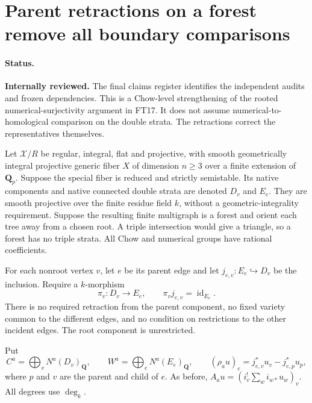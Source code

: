 \section{Parent retractions on a forest remove all boundary comparisons}
\label{r17fr:section}

\paragraph{Status.}
\textbf{Internally reviewed.} The final claims register identifies the independent audits and frozen dependencies.
This is a Chow-level strengthening of the rooted numerical-surjectivity
argument in FT17.  It does not assume numerical-to-homological
comparison on the double strata.  The retractions correct the
representatives themselves.

Let $\mathcal X/R$ be regular, integral, flat and projective,
with smooth geometrically integral projective generic fiber $X$
of dimension $n\ge3$ over a finite extension of $\mathbf Q_p$.
Suppose the special fiber is reduced and strictly semistable.
Its native components and native connected double strata are
denoted $D_v$ and $E_e$.  They are smooth projective over the
finite residue field $k$, without a geometric-integrality
requirement.  Suppose the resulting finite multigraph is a
forest and orient each tree away from a chosen root.  A triple
intersection would give a triangle, so a forest has no triple
strata.  All Chow and numerical groups have rational coefficients.

\begin{definition}
\label{r17fr:definition}
For each nonroot vertex $v$, let $e$ be its parent edge and
let $j_{e,v}:E_e\hookrightarrow D_v$ be the inclusion.
Require a $k$-morphism
\[
               \pi_v:D_v\longrightarrow E_e,
                 \qquad\pi_vj_{e,v}=\operatorname{id}_{E_e}.
 \tag{FR17.1}\label{r17fr:retraction}
\]
There is no required retraction from the parent component,
no fixed variety common to the different edges, and no
condition on restrictions to the other incident edges.
The root component is unrestricted.
\end{definition}

Put
\[
 C^a=\bigoplus_vN^a(D_v)_{\mathbf Q},\qquad
 W^a=\bigoplus_eN^a(E_e)_{\mathbf Q},\qquad
 (\rho_au)_e=j_{e,v}^*u_v-j_{e,p}^*u_p,
\]
where $p$ and $v$ are the parent and child of $e$.  As before,
$A_a u=(i_v^!\sum_wi_{w*}u_w)_v$.  All degrees use $\deg_k$.

